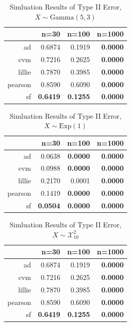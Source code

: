 \documentclass[twoside]{article}
\begin{document}
\begin{table}[ht]
\centering
\begin{tabular}{rrrr}
  \hline
 & n=30 & n=100 & n=1000 \\ 
  \hline
ad & 0.6874 & 0.1919 & \textbf{0.0000} \\ 
  cvm & 0.7216 & 0.2625 & \textbf{0.0000} \\ 
  lillie & 0.7870 & 0.3985 & \textbf{0.0000} \\ 
  pearson & 0.8590 & 0.6090 & \textbf{0.0000} \\ 
  sf & \textbf{0.6419} & \textbf{0.1255} & \textbf{0.0000} \\ 
   \hline
\end{tabular}
\caption{Simluation Results of Type II Error, $X\sim \mathrm{Gamma}(5,3)$}
\end{table}

\begin{table}[ht]
\centering
\begin{tabular}{rrrr}
  \hline
 & n=30 & n=100 & n=1000 \\ 
  \hline
ad & 0.0638 & \textbf{0.0000} & \textbf{0.0000} \\ 
  cvm & 0.0988 & \textbf{0.0000} & \textbf{0.0000} \\ 
  lillie & 0.2170 & 0.0001 & \textbf{0.0000} \\ 
  pearson & 0.1419 & \textbf{0.0000} & \textbf{0.0000} \\ 
  sf & \textbf{0.0504} & \textbf{0.0000} & \textbf{0.0000} \\ 
   \hline
\end{tabular}
\caption{Simluation Results of Type II Error, $X\sim \mathrm{Exp}(1)$}
\end{table}

\begin{table}[ht]
\centering
\begin{tabular}{rrrr}
  \hline
 & n=30 & n=100 & n=1000 \\ 
  \hline
ad & 0.6874 & 0.1919 & \textbf{0.0000} \\ 
  cvm & 0.7216 & 0.2625 & \textbf{0.0000} \\ 
  lillie & 0.7870 & 0.3985 & \textbf{0.0000} \\ 
  pearson & 0.8590 & 0.6090 & \textbf{0.0000} \\ 
  sf & \textbf{0.6419} & \textbf{0.1255} & \textbf{0.0000} \\ 
   \hline
\end{tabular}
\caption{Simluation Results of Type II Error, $X\sim \mathcal{X}^2_{10}$}
\end{table}
\end{document}

